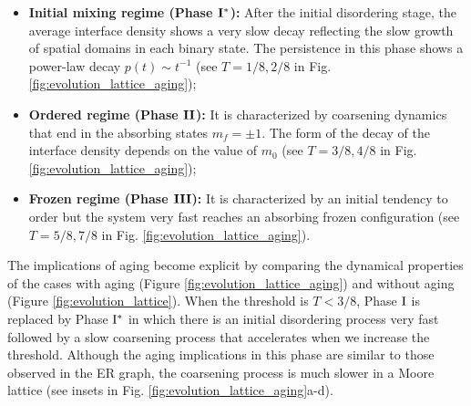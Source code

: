\begin{itemize}
    \item \textbf{Initial mixing regime (Phase ${\rm {\bf I}}^{*}$):}  After the initial disordering stage, the average interface density shows a very slow decay reflecting the slow growth of spatial domains in each binary state. The persistence in this phase shows a power-law decay $p(t) \sim t^{-1}$ (see $T = 1/8,2/8$ in Fig. \ref{fig:evolution_lattice_aging});
    \item \textbf{Ordered regime (Phase ${\rm {\bf II}}$):} It is characterized by coarsening dynamics that end in the absorbing states $m_f = \pm 1$. The form of the decay of the interface density depends on the value of $m_0$ (see $T = 3/8,4/8$ in Fig. \ref{fig:evolution_lattice_aging});
    \item \textbf{Frozen regime (Phase ${\rm {\bf III}}$):} It is characterized by an initial tendency to order but the system very fast reaches an absorbing frozen configuration (see $T = 5/8,7/8$ in Fig. \ref{fig:evolution_lattice_aging}).
\end{itemize}

The implications of aging become explicit by comparing the dynamical properties of the cases with aging (Figure \ref{fig:evolution_lattice_aging}) and without aging (Figure \ref{fig:evolution_lattice}). When the threshold is $T<3/8$, Phase ${\rm I}$ is replaced by Phase ${\rm I}^{*}$ in which there is an initial disordering process very fast followed by a slow coarsening process that accelerates when we increase the threshold. Although the aging implications in this phase are similar to those observed in the ER graph, the coarsening process is much slower in a Moore lattice (see insets in Fig. \ref{fig:evolution_lattice_aging}a-d).

